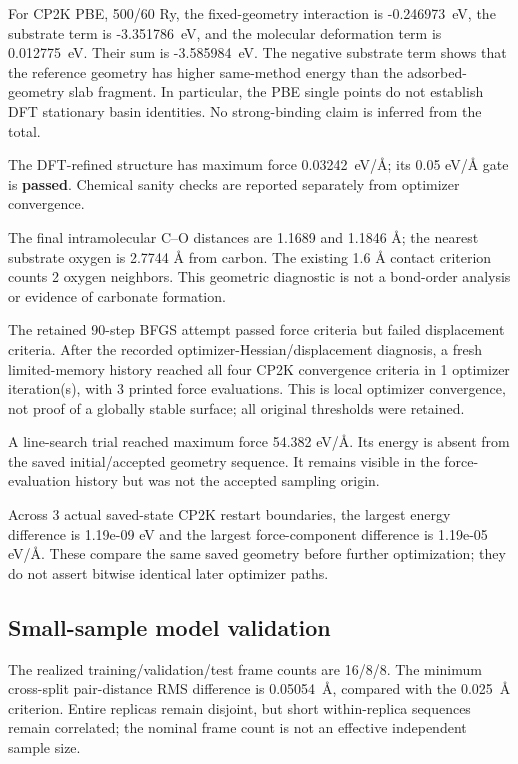 For CP2K PBE, 500/60 Ry, the fixed-geometry interaction is -0.246973~eV, the substrate term is -3.351786~eV, and the molecular deformation term is 0.012775~eV. Their sum is -3.585984~eV. The negative substrate term shows that the reference geometry has higher same-method energy than the adsorbed-geometry slab fragment. In particular, the PBE single points do not establish DFT stationary basin identities. No strong-binding claim is inferred from the total.

The DFT-refined structure has maximum force 0.03242~eV/\AA; its 0.05 eV/\AA{} gate is \textbf{passed}. Chemical sanity checks are reported separately from optimizer convergence.

The final intramolecular C--O distances are 1.1689 and 1.1846 \AA; the nearest substrate oxygen is 2.7744 \AA{} from carbon. The existing 1.6 \AA{} contact criterion counts 2 oxygen neighbors. This geometric diagnostic is not a bond-order analysis or evidence of carbonate formation.

The retained 90-step BFGS attempt passed force criteria but failed displacement criteria. After the recorded optimizer-Hessian/displacement diagnosis, a fresh limited-memory history reached all four CP2K convergence criteria in 1 optimizer iteration(s), with 3 printed force evaluations. This is local optimizer convergence, not proof of a globally stable surface; all original thresholds were retained.

A line-search trial reached maximum force 54.382 eV/\AA. Its energy is absent from the saved initial/accepted geometry sequence. It remains visible in the force-evaluation history but was not the accepted sampling origin.

Across 3 actual saved-state CP2K restart boundaries, the largest energy difference is 1.19e-09 eV and the largest force-component difference is 1.19e-05 eV/\AA. These compare the same saved geometry before further optimization; they do not assert bitwise identical later optimizer paths.

\subsection{Small-sample model validation}

The realized training/validation/test frame counts are 16/8/8. The minimum cross-split pair-distance RMS difference is 0.05054~\AA, compared with the 0.025~\AA{} criterion. Entire replicas remain disjoint, but short within-replica sequences remain correlated; the nominal frame count is not an effective independent sample size.

